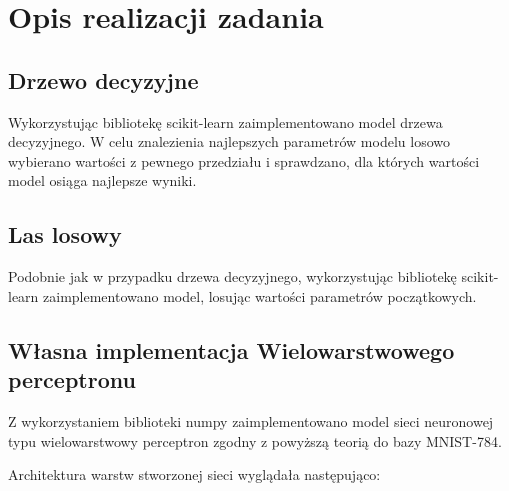 \documentclass{article}
\begin{document}
\section{Opis realizacji zadania}

\subsection{Drzewo decyzyjne}

Wykorzystując bibliotekę scikit-learn zaimplementowano model drzewa
decyzyjnego. W celu znalezienia najlepszych parametrów modelu losowo
wybierano wartości z pewnego przedziału i sprawdzano, dla których wartości
model osiąga najlepsze wyniki.

\subsection{Las losowy}

Podobnie jak w przypadku drzewa decyzyjnego, wykorzystując bibliotekę
scikit-learn zaimplementowano model, losując wartości parametrów początkowych.

\subsection{Własna implementacja Wielowarstwowego perceptronu}

Z wykorzystaniem biblioteki numpy zaimplementowano model sieci neuronowej 
typu wielowarstwowy perceptron zgodny z powyższą teorią do bazy MNIST-784.

Architektura warstw stworzonej sieci wyglądała następująco:

\end{document}
